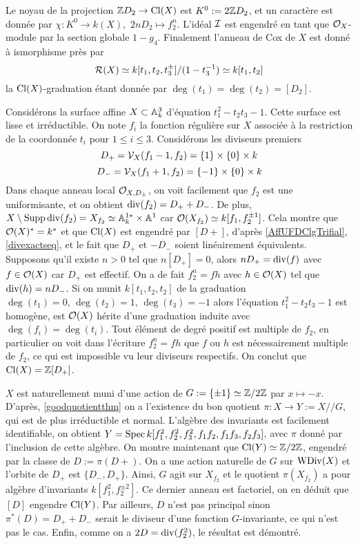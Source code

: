 \begin{ex}
Le noyau de la projection $\mathbb{Z} D_2\rightarrow \operatorname{Cl}(X)$ est $K^0:=2\mathbb{Z} D_2$, et un caractère est donnée par $\chi: K^0\rightarrow k(X),\,\,2nD_2\mapsto f_2^n$. L'idéal $\mathcal{I}$ est engendré en tant que $\mathcal{O}_X$-module par la section globale $1-g_4$. Finalement l'anneau de Cox de $X$ est donné à ismorphisme près par
$$\mathcal{R}(X)\simeq k[t_1,t_2,t_3^{\pm}]/(1-t_3^{-1})\simeq k[t_1,t_2]$$
la $\operatorname{Cl}(X)$-graduation étant donnée par $\deg(t_1)=\deg(t_2)=[D_2]$.
\end{ex}

\begin{ex}
Considérons la surface affine $X\subset \mathbb{A}_k^3$ d'équation $t_1^2-t_2t_3-1$. Cette surface est lisse et irréductible. On note $f_i$ la fonction régulière sur $X$ associée à la restriction de la coordonnée $t_i$ pour $1\leq i\leq 3$. Considérons les diviseurs premiers
$$D_+=\mathcal{V}_X(f_1-1,f_2)=\lbrace 1\rbrace\times\lbrace 0\rbrace\times k$$
$$D_-=\mathcal{V}_X(f_1+1,f_2)=\lbrace -1\rbrace\times\lbrace 0\rbrace\times k$$
Dans chaque anneau local $\mathcal{O}_{X,D_\pm}$, on voit facilement que $f_2$ est une uniformisante, et on obtient $\operatorname{div}(f_2)=D_++D_-$. De plus, $X\setminus\operatorname{Supp} \operatorname{div}(f_2)=X_{f_2}\simeq \mathbb{A}^{1*}_k\times \mathbb{A}^1$ car $\mathcal{O}(X_{f_2})\simeq k[f_1,f_2^{\pm 1}]$. Cela montre que $\mathcal{O}(X)^*=k^*$ et que $\operatorname{Cl}(X)$ est engendré par $[D+]$, d'après \ref{AffUFDClgTrifial}, \ref{divexactseq}, et le fait que $D_+$ et $-D_-$ soient linéairement équivalents. Supposons qu'il existe $n>0$ tel que $n[D_+]=0$, alors $nD_+=\operatorname{div}(f)$ avec $f\in\mathcal{O}(X)$ car $D_+$ est effectif. On a de fait $f_2^n=fh$ avec $h\in\mathcal{O}(X)$ tel que $\operatorname{div}(h)=nD_-$. Si on munit $k[t_1,t_2,t_2]$ de la graduation $\deg(t_1)=0,\,\deg(t_2)=1,\,\deg(t_3)=-1$ alors l'équation $t_1^2-t_2t_3-1$ est homogène, est $\mathcal{O}(X)$ hérite d'une graduation induite avec $\deg(f_i)=\deg(t_i)$. Tout élément de degré positif est multiple de $f_2$, en particulier on voit dans l'écriture $f_2^n=fh$ que $f$ ou $h$ est nécessairement multiple de $f_2$, ce qui est impossible vu leur diviseurs respectifs. On conclut que $\operatorname{Cl}(X)=\mathbb{Z}[D_+]$.

$X$ est naturellement muni d'une action de $G:=\lbrace \pm 1\rbrace\simeq \mathbb{Z}/2\mathbb{Z}$ par $x\mapsto -x$. D'après, \ref{goodquotientthm} on a l'existence du bon quotient $\pi:X\rightarrow Y:=X//G$, qui est de plus irréductible et normal. L'algèbre des invariants est facilement identifiable, on obtient  $Y=\operatorname{Spec} k[f_1^2,f_2^2,f_3^2,f_1f_2,f_1f_3,f_2f_3]$, avec $\pi$ donné par l'inclusion de cette algèbre. On montre maintenant que $\operatorname{Cl}(Y)\simeq \mathbb{Z}/2\mathbb{Z}$, engendré par la classe de $D:=\pi(D+)$. On a une action naturelle de $G$ sur $\operatorname{WDiv}(X)$ et l'orbite de $D_+$ est $\lbrace D_-,D_+\rbrace$. Ainsi, $G$ agit sur $X_{f_2}$ et le quotient $\pi(X_{f_2})$ a pour algèbre d'invariants $k[f_1^2,f_2^{\pm 2}]$. Ce dernier anneau est factoriel, on en déduit que $[D]$ engendre $\operatorname{Cl}(Y)$. Par ailleurs, $D$ n'est pas principal sinon $\pi^*(D)=D_++D_-$ serait le diviseur d'une fonction $G$-invariante, ce qui n'est pas le cas. Enfin, comme on a $2D=\operatorname{div}(f_2^2)$, le résultat est démontré.


\end{ex}
